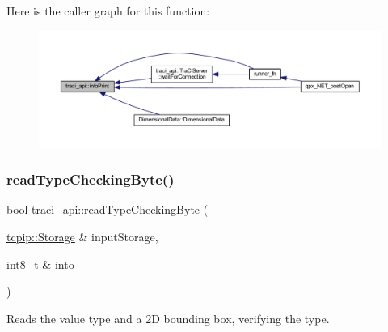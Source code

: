 Here is the caller graph for this function\+:
\nopagebreak
\begin{figure}[H]
\begin{center}
\leavevmode
\includegraphics[width=350pt]{namespacetraci__api_a3d103fa606d4762c375bac42c66f62a8_icgraph}
\end{center}
\end{figure}
\mbox{\label{namespacetraci__api_aee58441392da7b83ecd8c8831271e945}} 
\subsubsection{\texorpdfstring{read\+Type\+Checking\+Byte()}{readTypeCheckingByte()}}
{\footnotesize\ttfamily bool traci\+\_\+api\+::read\+Type\+Checking\+Byte (\begin{DoxyParamCaption}\item[{\hyperlink{classtcpip_1_1_storage}{tcpip\+::\+Storage} \&}]{input\+Storage,  }\item[{int8\+\_\+t \&}]{into }\end{DoxyParamCaption})}



Reads the value type and a 2D bounding box, verifying the type. 


